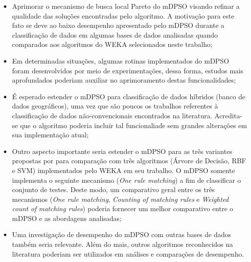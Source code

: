 \documentclass[
	12pt,				%
	openany,			%
	oneside,	
	a4paper,			%
	brazil,				%
	]{unimontes-ppgmsc-abntex2}
\begin{document}
\begin{itemize}
\item Aprimorar o mecanismo de busca local Pareto do mDPSO visando refinar a qualidade das soluções encontradas pelo algoritmo. A motivação para este fato se deve ao baixo desempenho apresentado pelo mDPSO durante a classificação de dados em algumas bases de dados analisadas quando comparados aos algoritmos do WEKA selecionados neste trabalho;
\item Em determinadas situações, algumas rotinas implementados do mDPSO foram desenvolvidos por meio de experimentações, dessa forma, estudos mais aprofundados poderiam auxiliar no aprimoramento destas funcionalidades;
\item É esperado estender o mDPSO para classificação de dados híbridos (banco de dados geográficos), uma vez que são poucos os trabalhos referentes à classificação de dados não-convencionais encontrados na literatura. Acredita-se que o algoritmo poderia incluir tal funcionaliade sem grandes alterações em sua implementação atual;
\item Outro aspecto importante seria estender o mDPSO para as três variantes propostas por  para comparação com três algoritmos (Árvore de Decisão, RBF e SVM) implementados pelo WEKA em seu trabalho. O mDPSO somente implementa o seguinte mecanismo ({\em One rule matching}) a fim de classificar o conjunto de testes. Deste modo, um comparativo geral entre os três mecanismos ({\em One rule matching}, {\em Counting of matching rules} e {\em Weighted count of matching rules}) poderia fornecer um melhor comparativo entre o mDPSO e as abordagens analisadas;
\item Uma investigação de desempenho do mDPSO com outras bases de dados também seria relevante. Além do mais, outros algoritmos reconhecidos na literatura poderiam ser utilizados em análises e comparações de desempenho.
\end{itemize}



\postextual

\renewcommand{\bibname}{Refer\^encias Bibliogr\'aficas}


\printindex
\end{document}
